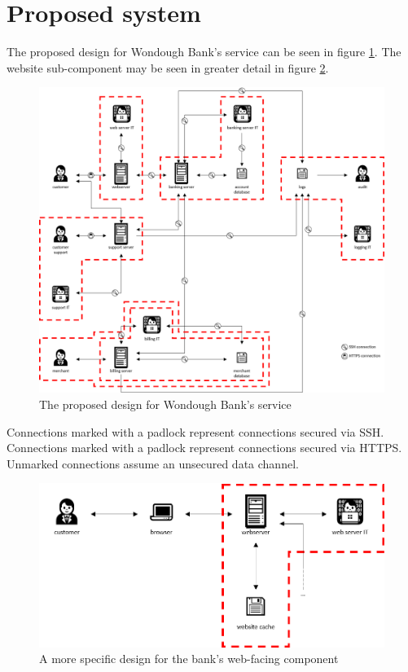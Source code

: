 \section{Proposed system}

The proposed design for Wondough Bank's service can be seen in figure \ref{fullDesign}. The website sub-component may be seen in greater detail in figure \ref{website}. 

\begin{figure}
    \includegraphics[width=\columnwidth]{images/bank-design}
    \caption{The proposed design for Wondough Bank's service}
    \centering
    \label{fullDesign}
\end{figure}

Connections marked with a padlock represent connections secured via SSH. Connections marked with a padlock represent connections secured via HTTPS. Unmarked connections assume an unsecured data channel.

\begin{figure}
    \includegraphics[width=\columnwidth]{images/web-design}
    \caption{A more specific design for the bank's web-facing component}
    \centering
    \label{website}
\end{figure}

